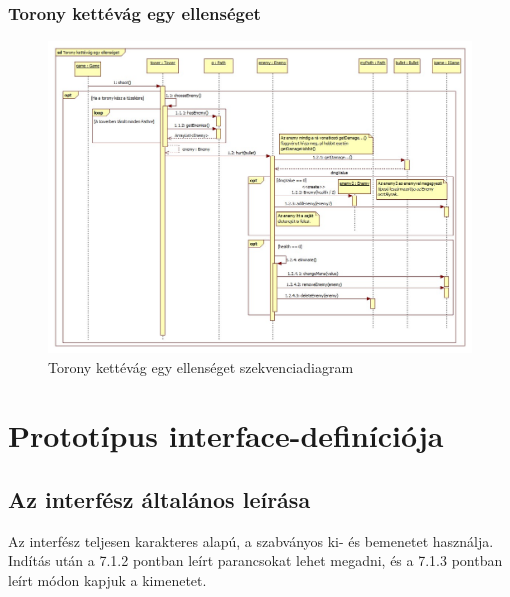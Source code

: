 \subsubsection{Torony kettévág egy ellenséget}
\begin{figure}[H]
\begin{center}
\includegraphics[width=17cm]{chapters/chapter07/images/sd_torony_kettevag_egy_ellenseget.jpg}
\caption{Torony kettévág egy ellenséget szekvenciadiagram}
\label{fig:Torony_kettevag_egy_ellenseget}
\end{center}
\end{figure}



\section{Prototípus interface-definíciója}




\subsection{Az interfész általános leírása}
Az interfész teljesen karakteres alapú, a szabványos ki- és bemenetet használja. Indítás után a 7.1.2 pontban leírt parancsokat lehet megadni, és a 7.1.3 pontban leírt módon kapjuk a kimenetet. 


